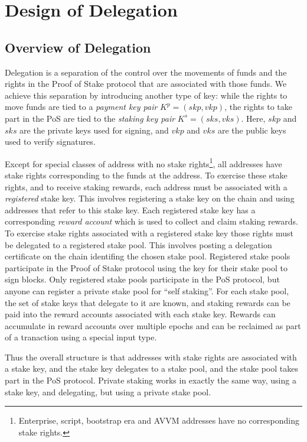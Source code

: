 \documentclass[11pt,a4paper]{article}
\begin{document}

\section{Design of Delegation}\label{design-of-delegation}

\subsection{Overview of Delegation}\label{overview-of-delegation}

Delegation is a separation of the control over the movements of funds
and the rights in the Proof of Stake protocol that are associated with
those funds. We achieve this separation by introducing another type of
key: while the rights to move funds are tied to a \emph{payment key
pair} \(K^p=(skp, vkp)\), the rights to take part in the PoS are tied to
the \emph{staking key pair} \(K^s=(sks, vks)\). Here, \(skp\) and
\(sks\) are the private keys used for signing, and \(vkp\) and \(vks\)
are the public keys used to verify signatures.

Except for special classes of address with no stake rights\footnote{Enterprise,
  script, bootstrap era and AVVM addresses have no corresponding stake
  rights.}, all addresses have stake rights corresponding to the funds
at the address. To exercise these stake rights, and to receive staking
rewards, each address must be associated with a \emph{registered} stake
key. This involves registering a stake key on the chain and using
addresses that refer to this stake key. Each registered stake key has a
corresponding \emph{reward account} which is used to collect and claim
staking rewards. To exercise stake rights associated with a registered
stake key those rights must be delegated to a registered stake pool.
This involves posting a delegation certificate on the chain identifing
the chosen stake pool. Registered stake pools participate in the Proof
of Stake protocol using the key for their stake pool to sign blocks.
Only registered stake pools participate in the PoS protocol, but anyone
can register a private stake pool for ``self staking''. For each stake
pool, the set of stake keys that delegate to it are known, and staking
rewards can be paid into the reward accounts associated with each stake
key. Rewards can accumulate in reward accounts over multiple epochs and
can be reclaimed as part of a tranaction using a special input type.

Thus the overall structure is that addresses with stake rights are
associated with a stake key, and the stake key delegates to a stake
pool, and the stake pool takes part in the PoS protocol. Private staking
works in exactly the same way, using a stake key, and delegating, but
using a private stake pool.
\end{document}
